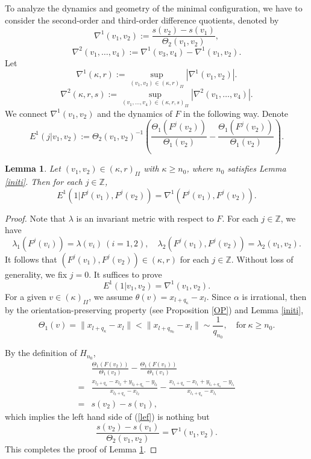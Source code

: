 \documentclass{amsart}
\newtheorem{Lemma}[Definition]{Lemma}
\theoremstyle{definition}
\begin{document}
To analyze the dynamics and geometry of the minimal configuration, we have to consider the second-order and third-order difference quotients, denoted by
\[\nabla^1(v_1,v_2):=\frac{s(v_2)-s(v_1)}{\Theta_2(v_1,v_2)},\] \[\nabla^2(v_1,\ldots,v_4):=\nabla^1(v_3,v_4)-\nabla^1(v_1,v_2).\]
Let
\begin{equation}\label{na11}
\nabla^1(\kappa,r):=\sup_{(v_1,v_2)\in (\kappa,r)_{II}}|\nabla^1(v_1,v_2)|.
\end{equation}
\begin{equation}\label{na22}
\nabla^2(\kappa,r,s):=\sup_{(v_1,\ldots,v_4)\in (\kappa,r,s)_{II}}|\nabla^2(v_1,\ldots,v_4)|.
\end{equation}
We connect $\nabla^1(v_1,v_2)$ and the dynamics of $F$ in the following way.
Denote
\begin{equation}\label{Ef}
E^1(j|v_1,v_2):=\Theta_2(v_1,v_2)^{-1}\left(\frac{\Theta_1(F^j(v_2))}{\Theta_1(v_2)}-\frac{\Theta_1(F^j(v_2))}{\Theta_1(v_2)}\right).
\end{equation}
\begin{Lemma}\label{v1v2}
Let $(v_1,v_2)\in (\kappa,r)_{II}$ with $\kappa\geq n_0$, where $n_0$ satisfies Lemma \ref{initi}. Then for each $j\in\mathbb{Z}$,
\[E^1(1|F^j(v_1),F^j(v_2))= \nabla^1(F^j(v_1),F^j(v_2)).\]
\end{Lemma}
\begin{proof} Note that $\lambda$ is an invariant metric with respect to $F$.   For each $j\in\mathbb{Z}$, we have
\[\lambda_1(F^j(v_i))=\lambda(v_i)\  (i=1,2), \quad \lambda_2(F^j(v_1),F^j(v_2))=\lambda_2(v_1,v_2).\]It follows that $(F^j(v_1),F^j(v_2))\in (\kappa,r)$ for each $j\in\mathbb{Z}$. Without loss of generality, we fix $j=0$. It suffices to prove
\begin{equation}\label{lef}
E^1(1|v_1,v_2)= \nabla^1(v_1,v_2).
\end{equation}
For a given $v\in (\kappa)_{II}$,  we assume $\theta(v)=x_{l+q_\kappa}-x_l$.
Since $\alpha$ is irrational, then by the orientation-preserving property (see Proposition \ref{OP}) and Lemma \ref{initi},
\[\Theta_1(v)=\|x_{l+q_\kappa}-x_{l}\|<\|x_{l+q_{n_0}}-x_{l}\|\sim \frac{1}{q_{n_0}},\quad \mathrm{for}\ \kappa\geq n_0.\]

By the definition of $H_{n_0}$,
\begin{align*}
	&\frac{\Theta_1(F(v_2))}{\Theta_1(v_2)}-\frac{\Theta_1(F(v_1))}{\Theta_1(v_1)}\\
	=&\frac{x_{l_2+q_\kappa}-x_{l_2}+y_{l_2+q_\kappa}-y_{l_2}}{x_{l_2+q_\kappa}-x_{l_2}}-
	\frac{x_{l_1+q_\kappa}-x_{l_1}+y_{l_1+q_\kappa}-y_{l_1}}{x_{l_1+q_\kappa}-x_{l_1}}\\
	=&s(v_2)-s(v_1),
\end{align*}
which implies the left hand side of (\ref{lef}) is nothing but
\[\frac{s(v_2)-s(v_1)}{\Theta_2(v_1,v_2)}=\nabla^1(v_1,v_2).\]
This completes the proof of Lemma \ref{v1v2}.
\end{proof}
\end{document}
